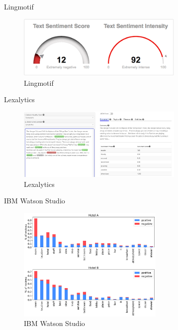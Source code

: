 \documentclass[aspectratio=169,xcolor=dvipsnames, t]{beamer}
\begin{document}
\begin{frame}{Lingmotif}
    \begin{figure}
        \includegraphics[width=8cm]{style_data/img/lingmotif.png}        
        \caption{Lingmotif}
    \end{figure}
\end{frame}
\begin{frame}{Lexalytics}
    \begin{figure}
        \includegraphics[width=8cm]{style_data/img/lexalytics_ejemplo.png}        
        \caption{Lexalytics}
    \end{figure}
\end{frame}

\begin{frame}{IBM Watson Studio}
    \begin{figure}
        \includegraphics[width=7cm]{style_data/img/ibmwatson.png}        
        \caption{IBM Watson Studio}
    \end{figure}
\end{frame}
\end{document}
